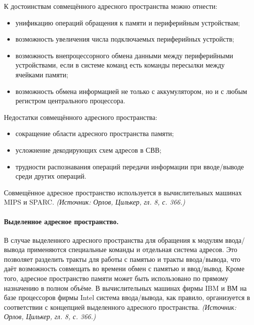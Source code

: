 \documentclass[a4paper,12pt]{article}
\begin{document}
К достоинствам совмещённого адресного пространства можно отнести:
\begin{itemize}
\item унификацию операций обращения к памяти и периферийным устройствам;
\item возможность увеличения числа подключаемых периферийных устройств;
\item возможность внепроцессорного обмена данными между периферийными устройствами, если в системе команд есть команды пересылки между ячейками памяти;
\item возможность обмена информацией не только с аккумулятором, но и с любым регистром центрального процессора.
\end{itemize}
Недостатки совмещённого адресного пространства:
\begin{itemize}
\item сокращение области адресного пространства памяти;
\item усложнение декодирующих схем адресов в СВВ;
\item трудности распознавания операций передачи информации при вводе/выводе среди других операций.
\end{itemize}
Совмещённое адресное пространство используется в вычислительных машинах MIPS и SPARC.
\textit{(Источник: Орлов, Цилькер, гл. 8, с. 366.)}

\paragraph{Выделенное адресное пространство.}
В случае выделенного адресного пространства для обращения к модулям ввода/вывода применяются специальные команды и отдельная система адресов. Это позволяет разделить тракты для работы с памятью и тракты ввода/вывода, что даёт возможность совмещать во времени обмен с памятью и ввод/вывод. Кроме того, адресное пространство памяти может быть использовано по прямому назначению в полном объёме. В вычислительных машинах фирмы IBM и ВМ на базе процессоров фирмы Intel система ввода/вывода, как правило, организуется в соответствии с концепцией выделенного адресного пространства.
\textit{(Источник: Орлов, Цилькер, гл. 8, с. 366.)}
\end{document}
